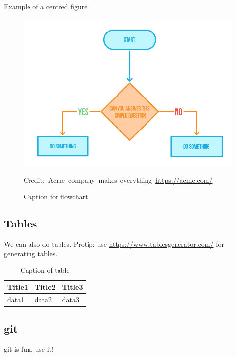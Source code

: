 Example of a centred figure
\begin{figure}[H]
    \centering
    \includegraphics[scale=0.5]{figures/Flowchart}
    \caption{Caption for flowchart}
  	\medskip 
	\hspace*{15pt}\hbox{\scriptsize Credit: Acme company makes everything \url{https://acme.com/}}
    \label{FlowchartFigure}
\end{figure}

\subsection{Tables}

We can also do tables. Protip: use \url{https://www.tablesgenerator.com/} for generating tables.
\begin{table}[H]
\centering
\caption{Caption of table}
\label{TableLabel}
\begin{tabular}{|l|l|l|}
\hline
Title1 & Title2 & Title3 \\ \hline
data1  & data2  & data3  \\ \hline
\end{tabular}
\end{table}

\subsection{\gls{git}}

\gls{git} is fun, use it!